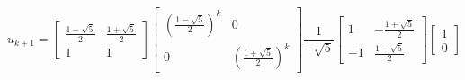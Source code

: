 \documentclass[preview]{standalone}
\begin{document}
\begin{center}
$$u_{k + 1} = \begin{bmatrix} \frac{1 - \sqrt{5}}{2} & \frac{1 + \sqrt{5}}{2} \\ 1 & 1 \end{bmatrix} \begin{bmatrix} \left( \frac{1 - \sqrt{5}}{2}\right)^k &  0 \\ 0 & \left(\frac{1 + \sqrt{5}}{2}\right)^k \end{bmatrix} \frac{1}{-\sqrt{5}}\begin{bmatrix} 1 & - \frac{1 + \sqrt{5}}{2} \\ -1 & \frac{1 - \sqrt{5}}{2} \end{bmatrix} \begin{bmatrix} 1 \\ 0 \end{bmatrix}$$
\end{center}
\end{document}
